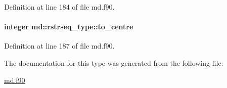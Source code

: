 Definition at line 184 of file md.\-f90.

\hypertarget{structmd_1_1rstrseq__type_a052efb643f6af6c4b17d9ec194108e03}{
\paragraph[{to\-\_\-centre}]{\setlength{\rightskip}{0pt plus 5cm}integer md\-::rstrseq\-\_\-type\-::to\-\_\-centre}}\label{structmd_1_1rstrseq__type_a052efb643f6af6c4b17d9ec194108e03}


Definition at line 187 of file md.\-f90.



The documentation for this type was generated from the following file\-:\begin{DoxyCompactItemize}
\item 
\hyperlink{md_8f90}{md.\-f90}\end{DoxyCompactItemize}
